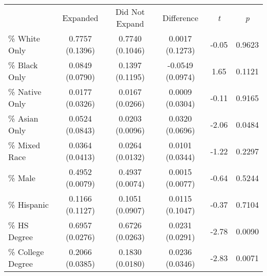 \centering
\begin{tabular}{llllll}
\cline{1-6}
\multicolumn{1}{c}{} &
  \multicolumn{1}{c}{Expanded} &
  \multicolumn{1}{c}{Did Not Expand} &
  \multicolumn{1}{c}{Difference} &
  \multicolumn{1}{c}{\textit{t}} &
  \multicolumn{1}{c}{\textit{p}} \\
\cline{1-6}
\multicolumn{1}{l}{\% White Only} &
  \multicolumn{1}{c}{0.7757 (0.1396)} &
  \multicolumn{1}{c}{0.7740 (0.1046)} &
  \multicolumn{1}{c}{0.0017 (0.1273)} &
  \multicolumn{1}{c}{-0.05} &
  \multicolumn{1}{c}{0.9623} \\
\multicolumn{1}{l}{\% Black Only} &
  \multicolumn{1}{c}{0.0849 (0.0790)} &
  \multicolumn{1}{c}{0.1397 (0.1195)} &
  \multicolumn{1}{c}{-0.0549 (0.0974)} &
  \multicolumn{1}{c}{1.65} &
  \multicolumn{1}{c}{0.1121} \\
\multicolumn{1}{l}{\% Native Only} &
  \multicolumn{1}{c}{0.0177 (0.0326)} &
  \multicolumn{1}{c}{0.0167 (0.0266)} &
  \multicolumn{1}{c}{0.0009 (0.0304)} &
  \multicolumn{1}{c}{-0.11} &
  \multicolumn{1}{c}{0.9165} \\
\multicolumn{1}{l}{\% Asian Only} &
  \multicolumn{1}{c}{0.0524 (0.0843)} &
  \multicolumn{1}{c}{0.0203 (0.0096)} &
  \multicolumn{1}{c}{0.0320 (0.0696)} &
  \multicolumn{1}{c}{-2.06} &
  \multicolumn{1}{c}{0.0484} \\
\multicolumn{1}{l}{\% Mixed Race} &
  \multicolumn{1}{c}{0.0364 (0.0413)} &
  \multicolumn{1}{c}{0.0264 (0.0132)} &
  \multicolumn{1}{c}{0.0101 (0.0344)} &
  \multicolumn{1}{c}{-1.22} &
  \multicolumn{1}{c}{0.2297} \\
\multicolumn{1}{l}{\% Male} &
  \multicolumn{1}{c}{0.4952 (0.0079)} &
  \multicolumn{1}{c}{0.4937 (0.0074)} &
  \multicolumn{1}{c}{0.0015 (0.0077)} &
  \multicolumn{1}{c}{-0.64} &
  \multicolumn{1}{c}{0.5244} \\
\multicolumn{1}{l}{\% Hispanic} &
  \multicolumn{1}{c}{0.1166 (0.1127)} &
  \multicolumn{1}{c}{0.1051 (0.0907)} &
  \multicolumn{1}{c}{0.0115 (0.1047)} &
  \multicolumn{1}{c}{-0.37} &
  \multicolumn{1}{c}{0.7104} \\
\multicolumn{1}{l}{\% HS Degree} &
  \multicolumn{1}{c}{0.6957 (0.0276)} &
  \multicolumn{1}{c}{0.6726 (0.0263)} &
  \multicolumn{1}{c}{0.0231 (0.0291)} &
  \multicolumn{1}{c}{-2.78} &
  \multicolumn{1}{c}{0.0090} \\
\multicolumn{1}{l}{\% College Degree} &
  \multicolumn{1}{c}{0.2066 (0.0385)} &
  \multicolumn{1}{c}{0.1830 (0.0180)} &
  \multicolumn{1}{c}{0.0236 (0.0346)} &
  \multicolumn{1}{c}{-2.83} &
  \multicolumn{1}{c}{0.0071} \\
\cline{1-6}
\end{tabular}
